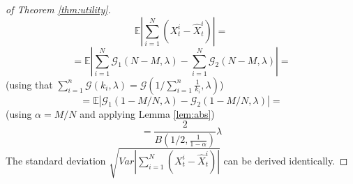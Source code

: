 \documentclass[11pt,a4paper]{article}
\theoremstyle{plain}
\theoremstyle{plain}
\theoremstyle{plain}
\theoremstyle{plain}
\theoremstyle{nonumberplain} \theoremseparator{}
\newtheorem{proof}{Proof}
\begin{document}
\begin{proof}[of Theorem \ref{thm:utility}]
$$
\mathbb{E} | \sum_{i=1}^{N} (X_{t}^{i} - \hat{X}_{t}^{i}) | =
$$
$$
= \mathbb{E}|\sum_{i=1}^{N}\mathcal{G}_{1}(N-M, \lambda) - \sum_{i=1}^{N} \mathcal{G}_{2}(N-M, \lambda)| =
$$
(using that $\sum_{i=1}^{n}\mathcal{G}(k_{i}, \lambda) = \mathcal{G}(1/\sum_{i=1}^{n} \frac{1}{ k_{i}}, \lambda)$)
$$
= \mathbb{E}|\mathcal{G}_{1}(1-M/N, \lambda) - \mathcal{G}_{2}(1-M/N, \lambda)| = 
$$
(using $\alpha = M/N$ and applying Lemma \ref{lem:abs})
$$
= \frac{2}{B(1/2,\frac{1}{1-\alpha})}\lambda
$$
The standard deviation 
$\sqrt{\mathit{Var} | \sum_{i=1}^{N} (X_{t}^{i} - \hat{X}_{t}^{i}) |}$ can be derived identically.

\end{proof}
\end{document}
